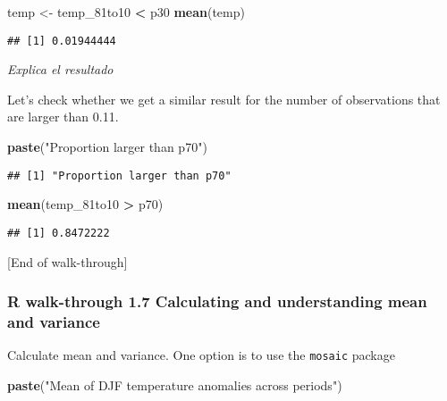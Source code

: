 \documentclass[
]{article}
\newenvironment{Shaded}{\begin{snugshade}}{\end{snugshade}}
\newcommand{\FunctionTok}[1]{\textcolor[rgb]{0.13,0.29,0.53}{\textbf{#1}}}
\newcommand{\NormalTok}[1]{#1}
\newcommand{\OtherTok}[1]{\textcolor[rgb]{0.56,0.35,0.01}{#1}}
\newcommand{\SpecialCharTok}[1]{\textcolor[rgb]{0.81,0.36,0.00}{\textbf{#1}}}
\newcommand{\StringTok}[1]{\textcolor[rgb]{0.31,0.60,0.02}{#1}}
\begin{document}
\begin{Shaded}
\begin{Highlighting}[]
\NormalTok{temp }\OtherTok{\textless{}{-}}\NormalTok{ temp\_81to10 }\SpecialCharTok{\textless{}}\NormalTok{ p30}
\FunctionTok{mean}\NormalTok{(temp)}
\end{Highlighting}
\end{Shaded}

\begin{verbatim}
## [1] 0.01944444
\end{verbatim}

\emph{Explica el resultado}

Let's check whether we get a similar result for the number of
observations that are larger than 0.11.

\begin{Shaded}
\begin{Highlighting}[]
\FunctionTok{paste}\NormalTok{(}\StringTok{"Proportion larger than p70"}\NormalTok{)}
\end{Highlighting}
\end{Shaded}

\begin{verbatim}
## [1] "Proportion larger than p70"
\end{verbatim}

\begin{Shaded}
\begin{Highlighting}[]
\FunctionTok{mean}\NormalTok{(temp\_81to10 }\SpecialCharTok{\textgreater{}}\NormalTok{ p70)}
\end{Highlighting}
\end{Shaded}

\begin{verbatim}
## [1] 0.8472222
\end{verbatim}

{[}End of walk-through{]}

\subsubsection{R walk-through 1.7 Calculating and understanding mean and
variance}\label{r-walk-through-1.7-calculating-and-understanding-mean-and-variance}

Calculate mean and variance. One option is to use the \texttt{mosaic}
package

\begin{Shaded}
\begin{Highlighting}[]
\FunctionTok{paste}\NormalTok{(}\StringTok{"Mean of DJF temperature anomalies across periods"}\NormalTok{)}
\end{Highlighting}
\end{Shaded}
\end{document}
